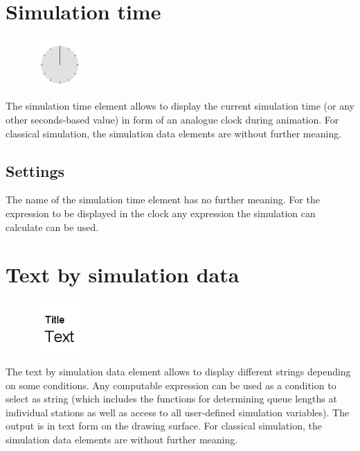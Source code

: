 \section{Simulation time}
\label{ref:ModelElementAnimationClock}

\begin{figure}
\vspace{-22pt}
\includegraphics[width=2cm]{imageModelElementAnimationClock.png}
\vspace{-22pt}
\end{figure}

The simulation time element allows to display the current simulation time
(or any other seconds-based value) in form of an analogue clock during animation.
For classical simulation, the simulation data elements are without further meaning.

\subsection*{Settings}

The name of the simulation time element has no further meaning.
For the expression to be displayed in the clock any expression the simulation can calculate can be used.


\section{Text by simulation data}
\label{ref:ModelElementAnimationTextSelect}

\begin{figure}
\vspace{-22pt}
\includegraphics[width=2cm]{imageModelElementAnimationTextSelect.png}
\vspace{-22pt}
\end{figure}

The text by simulation data element allows to display different strings depending on some conditions.
Any computable expression can be used as a condition to select as string (which includes the functions for
determining queue lengths at individual stations as well as access to all user-defined simulation
variables). The output is in text form on the drawing surface. For classical simulation, the simulation
data elements are without further meaning.

